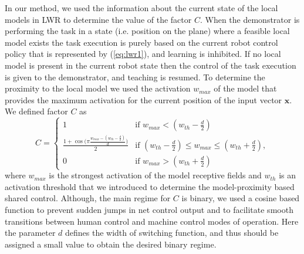 In our method, we used the information about the current state of the local models in LWR to determine the value of the factor $C$. When the demonstrator is performing the task in a state (i.e. position on the plane) where a feasible local model exists the task execution is purely based on the current robot control policy that is represented by (\ref{eq:lwr1}), and learning is inhibited. If no local model is present in the current robot state then the control of the task execution is given to the demonstrator, and teaching is resumed. To determine the proximity to the local model we used the activation $w_{max}$ of the model that provides the maximum activation for the current position of the input vector $\bm{x}$. We defined factor $C$ as
\begin{equation}
C = \begin{cases} 1 & \text{if } w_{max} < (w_{th} - \frac{d}{2})
\\ \frac{ 1 + \cos \big(\pi \frac{w_{max} - (w_{th} - \frac{d}{2}) }{d}\big)}{2}  & \text{if } (w_{th} - \frac{d}{2}) \leq w_{max} \leq (w_{th} + \frac{d}{2}),
\\ 0 & \text{if } w_{max} > (w_{th} + \frac{d}{2}) \end{cases}
\label{eq:factor}
\end{equation}
where $w_{max}$ is the strongest activation of the model receptive fields \cite{Schaal1998} and $w_{th}$ is an activation threshold that we introduced to determine the model-proximity based shared control. Although, the main regime for $C$ is binary, we used a cosine based function to prevent sudden jumps in net control output and to facilitate smooth transitions between human control and machine control modes of operation. Here the parameter $d$ defines the width of switching function, and thus should be assigned a small value to obtain the desired binary regime.

